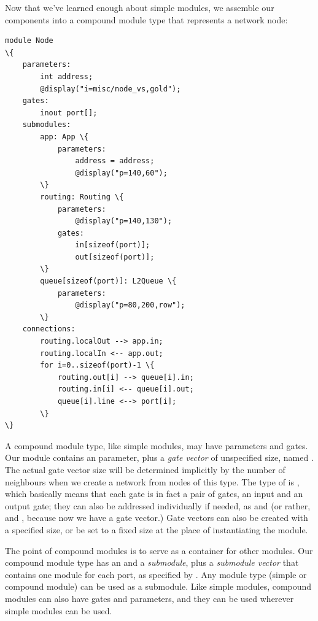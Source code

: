 Now that we've learned enough about simple modules, we assemble our components
into a compound module type that represents a network node:

\begin{Verbatim}[commandchars=\\\{\}]
module Node
\{
    parameters:
        int address;
        @display("i=misc/node_vs,gold");
    gates:
        inout port[];
    submodules:
        app: App \{
            parameters:
                address = address;
                @display("p=140,60");
        \}
        routing: Routing \{
            parameters:
                @display("p=140,130");
            gates:
                in[sizeof(port)];
                out[sizeof(port)];
        \}
        queue[sizeof(port)]: L2Queue \{
            parameters:
                @display("p=80,200,row");
        \}
    connections:
        routing.localOut --> app.in;
        routing.localIn <-- app.out;
        for i=0..sizeof(port)-1 \{
            routing.out[i] --> queue[i].in;
            routing.in[i] <-- queue[i].out;
            queue[i].line <--> port[i];
        \}
\}
\end{Verbatim}

A compound module type, like simple modules, may have parameters and gates.
Our  module contains an  parameter, plus a
\textit{gate vector} of unspecified size, named .
The actual gate vector size will be determined implicitly by the number
of neighbours when we create a network from nodes of this type.
The type of  is , which basically means that
each gate is in fact a pair of gates, an input and an output gate;
they can also be addressed individually if needed, as  and
 (or rather,  and ,
because now we have a gate vector.) Gate vectors can also be created with
a specified size, or be set to a fixed size at the place
of instantiating the module.

The point of compound modules is to serve as a container for other
modules. Our  compound module type has an  and
a  \textit{submodule}, plus a  \textit{submodule vector}
that contains one  module for each port, as specified by
.
Any module type (simple or compound module) can be used as a submodule.
Like simple modules, compound modules can also have gates and parameters,
and they can be used wherever simple modules can be used.

